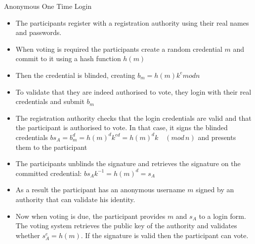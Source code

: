 \documentclass{beamer}
\newcommand{\md}[1]{\quad (mod \, {#1})}
\begin{document}
\begin{frame}[allowframebreaks]{Anonymous One Time Login}
\begin{itemize}
\item The participants register with a registration authority using their real names and passwords.
\item When voting is required the participants create a random credential $m$ and commit to it using a hash function $h(m)$
\item Then the credential is blinded,  creating $b_m = h(m) k^e mod n$
\item To validate that they are indeed authorised to vote, they login with their real credentials and submit $b_m$
\item The registration authority checks that the login credentials are valid and that the participant is authorised to vote. In that case, it signs the blinded credentials $bs_A =b_m^d= h(m)^d k^{ed} = h(m)^d k \md{n}$ and presents them to the participant
\item The participants unblinds the signature and retrieves the signature on the committed credential: $bs_A k^{-1} = h(m)^d = s_A$
\item As a result the participant has an anonymous username $m$ signed by an authority that can validate his identity. 
\item Now when voting is due, the participant provides $m$ and $s_A$ to a login form. The voting system retrieves the public key of the authority and validates whether $s_A^e = h(m)$. If the signature is valid then the participant can vote.
\end{itemize}
\end{frame}
\end{document}
